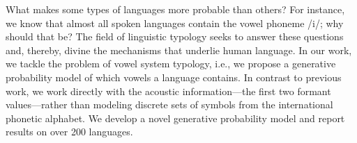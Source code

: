 What makes some types of languages more probable than others? For instance, we know that almost all spoken languages contain the vowel phoneme /i/; why should that be? The field of linguistic typology seeks to answer these questions and, thereby, divine the mechanisms that underlie human language. In our work, we tackle the problem of vowel system typology, i.e., we propose a generative probability model of which vowels a language contains. In contrast to previous work, we work directly with the acoustic information---the first two formant values---rather than modeling discrete sets of symbols from the international phonetic alphabet. We develop a novel generative probability model and report results on over 200 languages.
